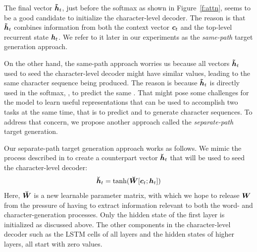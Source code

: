 The final vector $\mbox{\boldmath{$\tilde{h}$}}_{t}$, just before the
softmax as shown in Figure~\ref{f:attn}, seems to be a good candidate to initialize the character-level decoder.
The reason is that $\mbox{\boldmath{$\tilde{h}$}}_{t}$ combines
information from both the context vector $\mbox{\boldmath{$c$}}_{t}$ and the top-level recurrent
state $\mbox{\boldmath{$h$}}_{t}$. We refer to it later in our
experiments as the \textit{same-path} target generation approach.

On the other hand, the same-path approach worries us because all vectors $\mbox{\boldmath{$\tilde{h}$}}_{t}$
used to seed the character-level decoder might have similar values, leading to
the same character sequence being produced.
The reason is because $\mbox{\boldmath{$\tilde{h}$}}_{t}$ is directly used in the softmax, , to predict the same \unk{}.
That might pose some challenges for the model to learn useful representations
that can be used to accomplish two tasks at the same time, that is to predict
\unk{} and to generate character sequences.
To address that concern, we propose another approach called
the \textit{separate-path} target generation.

Our separate-path target generation approach works as follows. We mimic the
process described in  to create a counterpart vector $\mbox{\boldmath{$\breve{h}$}}_{t}$ that will be
used to seed the character-level decoder:
\begin{equation}
\mbox{\boldmath{$\breve{h}$}}_{t} = \tanh(\mbox{\boldmath{$\breve{W}$}}[\mbox{\boldmath{$c$}}_{t}; \mbox{\boldmath{$h$}}_{t}])
\label{e:hc}
\end{equation} 
Here, $\mbox{\boldmath{$\breve{W}$}}$ is a new learnable parameter matrix, with which we
hope to release $\bm{W}_{}$ from the pressure of having to extract information
relevant to both the word- and character-generation processes.
Only the hidden
state of the first layer is initialized as discussed above. The other components
in the character-level decoder such as the
LSTM cells of all layers and the hidden states of higher layers, all start with zero values.


